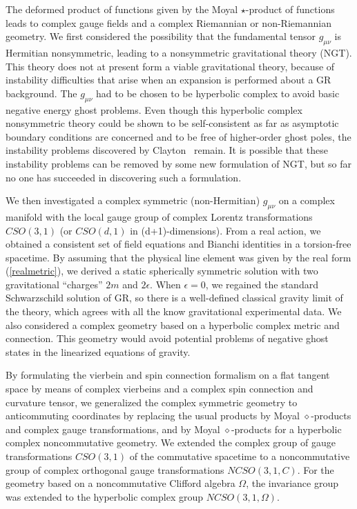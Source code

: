 \documentclass[a4paper,10pt]{article}
\begin{document}
The deformed product of functions given by the
Moyal $\star$-product of functions leads to complex gauge fields and a
complex Riemannian or non-Riemannian geometry. We first considered the
possibility that the fundamental tensor $g_{\mu\nu}$ is Hermitian
nonsymmetric, leading to a nonsymmetric gravitational theory (NGT). This
theory does not at present form a viable gravitational theory, because of
instability difficulties that arise when an expansion is performed about a
GR background. The $g_{\mu\nu}$ had to be chosen to be hyperbolic
complex to avoid basic negative energy ghost problems. Even though this
hyperbolic complex nonsymmetric theory could be shown to be self-consistent
as far as asymptotic boundary conditions are concerned and to be free of
higher-order ghost poles, the instability problems discovered by
Clayton~\cite{Clayton,Clayton2} remain. It is possible that these
instability problems can be removed by some new formulation of
NGT, but so far no one has succeeded in discovering such a
formulation.

We then investigated a complex symmetric (non-Hermitian) $g_{\mu\nu}$
on a complex manifold with the local gauge group of complex
Lorentz transformations $CSO(3,1)$ (or $CSO(d,1)$ in
(d+1)-dimensions). From a real action, we obtained a consistent set of
field equations and Bianchi identities in a torsion-free spacetime. By
assuming that the physical line element was given by the real form
(\ref{realmetric}), we derived a static spherically symmetric solution
with two gravitational ``charges'' $2m$ and $2\epsilon$. When $\epsilon=0$,
we regained the standard Schwarzschild solution of GR, so there is a
well-defined classical gravity limit of the theory, which agrees with all
the know gravitational experimental data. We also considered a complex
geometry based on a hyperbolic complex metric and connection. This geometry
would avoid potential problems of negative ghost states in the linearized
equations of gravity.

By formulating the vierbein and spin connection
formalism on a flat tangent space by means of complex vierbeins and a
complex spin connection and curvature tensor, we generalized the complex
symmetric geometry to anticommuting coordinates by replacing the usual
products by Moyal $\diamond$-products and complex gauge transformations, and
by Moyal $\diamond$-products for a hyperbolic complex noncommutative
geometry. We extended the complex group of gauge transformations $CSO(3,1)$
of the commutative spacetime to a noncommutative group of complex
orthogonal gauge transformations $NCSO(3,1, C)$. For the
geometry based on a noncommutative Clifford algebra $\Omega$, the
invariance group was extended to the hyperbolic complex group
$NCSO(3,1,\Omega)$.
\end{document}
